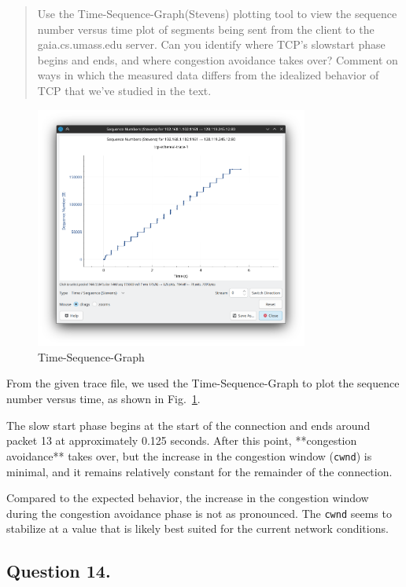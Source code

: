 \documentclass{cshwk}
\begin{document}
\begin{quote}
    Use the Time-Sequence-Graph(Stevens) plotting tool to view the sequence number versus time plot of segments being sent from the client to the gaia.cs.umass.edu server. Can you identify where TCP’s slowstart phase begins and ends, and where congestion avoidance takes over? Comment on ways in which the measured data differs from the idealized behavior of TCP that we’ve studied in the text.
\end{quote}

\begin{figure}[htbp]
    \centering
    \includegraphics[width=0.8\textwidth]{./lab3-13.png}
    \caption{Time-Sequence-Graph}
    \label{fig:TSG-given}
\end{figure}

From the given trace file, we used the Time-Sequence-Graph to plot the sequence number versus time, as shown in Fig.~\ref{fig:TSG-given}.

The slow start phase begins at the start of the connection and ends around packet 13 at approximately 0.125 seconds. After this point, **congestion avoidance** takes over, but the increase in the congestion window (\texttt{cwnd}) is minimal, and it remains relatively constant for the remainder of the connection.

Compared to the expected behavior, the increase in the congestion window during the congestion avoidance phase is not as pronounced. The \texttt{cwnd} seems to stabilize at a value that is likely best suited for the current network conditions.

\subsection*{Question 14.}
\end{document}
